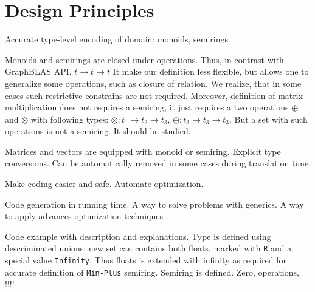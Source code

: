 \section{Design Principles}

Accurate type-level encoding of domain: monoids, semirings.

Monoids and semirings are closed under operations. 
Thus, in contrast with GraphBLAS API, $t \to t \to t$  
It make our definition less flexible, but allows one to generalize some operations, such as closure of relation.
We realize, that in some cases such restrictive constrains are not required.
Moreover, definition of matrix multiplication does not requires a semiring, it just requires a two operations $\oplus$ and $\otimes$ with following types: $\otimes: t_1 \to t_2 \to t_3$, $\oplus: t_3 \to t_3 \to t_3 $. 
But a set with such operations is not a semiring. 
It should be studied.

Matrices and vectors are equipped with monoid or semiring.
Explicit type conversions. 
Can be automatically removed in some cases during translation time.

Make coding easier and safe. 
Automate optimization.

Code generation in running time.
A way to solve problems with generics.
A way to apply advances optimization techniques~\cite{10.1145/3332466.3374507}

Code example with description and explanations.
Type is defined using descriminated unions: new set can contains both floats, marked with  \texttt{R} and a special value \texttt{Infinity}.
Thus floats is extended with infinity as required for accurate definition of \texttt{Min-Plus} semiring.
Semiring is defined.
Zero, operations, !!!!


